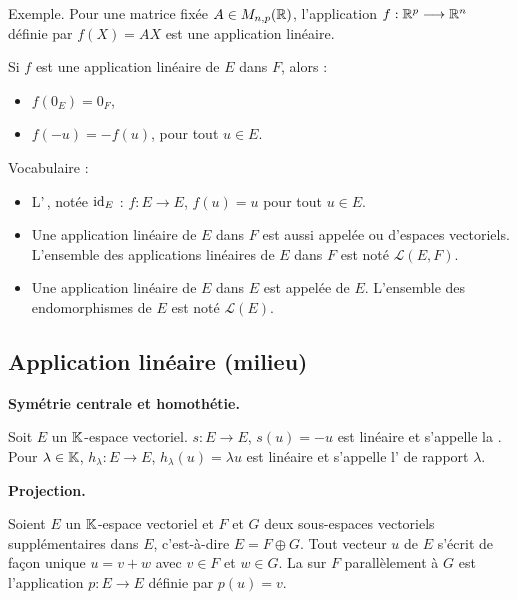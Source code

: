 \documentclass[10pt,class=article,crop=false]{standalone}
\begin{document}
\begin{multicols}{2}
Exemple. 
Pour une matrice fixée $A \in M_{n,p}(\mathbb{R})$,
l'application $f : \mathbb{R}^p \longrightarrow \mathbb{R}^n$ définie par
$f(X) = AX$ est une application linéaire.


\begin{proposition}
	Si $f$ est une application linéaire de $E$ dans $F$, alors :
	\begin{itemize}
		\item $f(0_{E})=0_{F}$,
		\item $f(-u)=-f(u)$, pour tout $u \in E$.
	\end{itemize}
\end{proposition}

Vocabulaire :
\begin{itemize}
	\item L'\,, notée $\operatorname{id}_E$ :
	$f : E \longrightarrow E$, $f(u) = u$ pour tout $u \in E$.
	
	\item Une application linéaire de $E$ dans $F$ est
	aussi appelée  ou  d'espaces vectoriels.
	L'ensemble des applications linéaires de $E$ dans $F$ est noté $\mathcal{L}(E,F)$.
	
	\item Une application linéaire de $E$ dans $E$ est appelée  de $E$.
	L'ensemble des endomorphismes de $E$ est noté  $\mathcal{L}(E)$.
\end{itemize}

\subsection{Application linéaire (milieu)}



\textbf{Symétrie centrale et homothétie.}

Soit $E$ un $\mathbb{K}$-espace vectoriel.
$s : E \to E$, $s(u)=-u$ est linéaire et s'appelle la .
Pour $\lambda \in \mathbb{K}$, $h_\lambda : E \to E$, $h_\lambda(u)= \lambda u$ est linéaire et s'appelle  l' de rapport $\lambda$.





\textbf{Projection.}

Soient $E$ un $\mathbb{K}$-espace vectoriel et $F$ et $G$ deux sous-espaces
vectoriels supplémentaires dans $E$, c'est-à-dire $E = F \oplus G$.
Tout vecteur $u$ de $E$ s'écrit de façon unique  $u=v+w$ avec $v \in F$ et $w \in G$.
La  sur $F$ parallèlement à $G$ est l'application $p : E \to E$
définie par $p(u)=v$.


\end{multicols}
\end{document}
